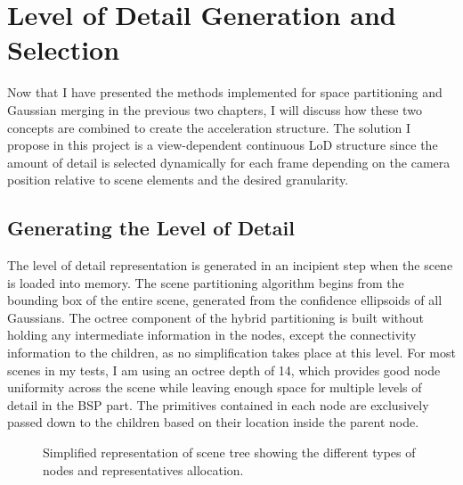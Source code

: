 \section{Level of Detail Generation and Selection}
Now that I have presented the methods implemented for space partitioning and Gaussian merging in the previous two chapters, I will discuss how these two concepts are combined to create the acceleration structure. The solution I propose in this project is a view-dependent continuous LoD structure \cite{lod} since the amount of detail is selected dynamically for each frame depending on the camera position relative to scene elements and the desired granularity.

\subsection{Generating the Level of Detail}
The level of detail representation is generated in an incipient step when the scene is loaded into memory. The scene partitioning algorithm begins from the bounding box of the entire scene, generated from the confidence ellipsoids of all Gaussians. The octree component of the hybrid partitioning is built without holding any intermediate information in the nodes, except the connectivity information to the children, as no simplification takes place at this level. For most scenes in my tests, I am using an octree depth of 14, which provides good node uniformity across the scene while leaving enough space for multiple levels of detail in the BSP part. The primitives contained in each node are exclusively passed down to the children based on their location inside the parent node.

\begin{figure}[H]
    \centering
    \makebox[\textwidth][c]{}
    \caption{Simplified representation of scene tree showing the different types of nodes and representatives allocation.}
    \label{fig:scenetree}
\end{figure}

